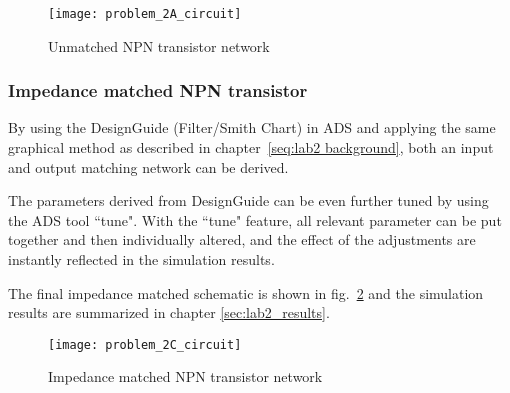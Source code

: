 \documentclass[report.tex]{subfiles}
\begin{document}
\begin{figure}[h]
    \centering
    \texttt{[image: problem\_2A\_circuit]}
    \caption{Unmatched NPN transistor network}
    \label{fig:problem 2A circuit}
\end{figure}

\subsubsection{Impedance matched NPN transistor}
By using the DesignGuide (Filter/Smith Chart) in ADS and applying the same graphical method as described in chapter~\ref{seq:lab2 background}, both an input and output matching network can be derived.

The parameters derived from DesignGuide can be even further tuned by using the ADS tool ``tune". With the ``tune" feature, all relevant parameter can be put together and then individually altered, and the effect of the adjustments are instantly reflected in the simulation results.

The final impedance matched schematic is shown in fig.~\ref{fig:problem 2C circuit} and the simulation results are summarized in chapter \ref{sec:lab2_results}.

\begin{figure}[h]
    \centering
    \texttt{[image: problem\_2C\_circuit]}
    \caption{Impedance matched NPN transistor network}
    \label{fig:problem 2C circuit}
\end{figure}
\end{document}
